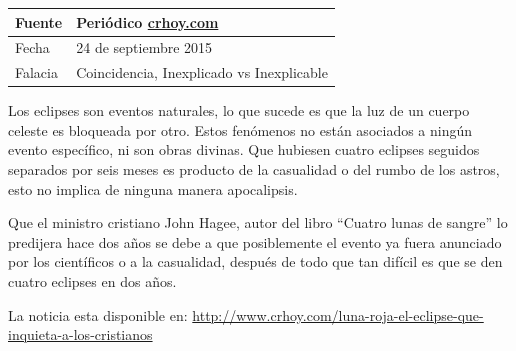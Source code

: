 \documentclass[times]{simauth}
\begin{document}
\newpage
\begin{table}[h!]
    \begin{tabular}{ll} 
        \toprule[1.5pt]
        Fuente & Periódico \href{http://www.crhow.com}{crhoy.com}\\
        \midrule[0.5pt]
        Fecha  & 24 de septiembre 2015\\
        \midrule[0.5pt]
        Falacia & Coincidencia, Inexplicado vs Inexplicable \\
        \bottomrule[1.5pt]
    \end{tabular} 
\end{table}

Los eclipses son eventos naturales, lo que sucede es que la luz de un cuerpo celeste es bloqueada por otro. Estos fenómenos no están asociados a ningún evento específico, ni son obras divinas. Que hubiesen cuatro eclipses seguidos separados por seis meses es producto de la casualidad o del rumbo de los astros, esto no implica de ninguna manera apocalipsis.  

Que el ministro cristiano John Hagee, autor del libro ``Cuatro lunas de sangre'' lo predijera hace dos años se debe a que posiblemente el evento ya fuera anunciado por los científicos o a la casualidad, después de todo que tan difícil es que se den cuatro eclipses en dos años. 

La noticia esta disponible en: \href{http://www.crhoy.com/luna-roja-el-eclipse-que-inquieta-a-los-cristianos}{http://www.crhoy.com/luna-roja-el-eclipse-que-inquieta-a-los-cristianos}


\newpage
\end{document}
